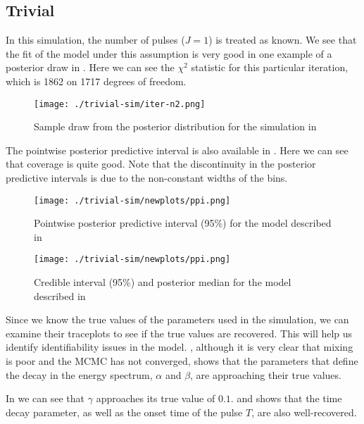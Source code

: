 \documentclass[12pt,letterpaper]{article}
\begin{document}
\subsection{Trivial}
\label{ss:trivial}
In this simulation, the number of pulses ($J=1$) is treated as known. We see that the fit of the model under this assumption is very good in one example of a posterior draw in . Here we can see the $\chi^2$ statistic for this particular iteration, which is 1862 on 1717 degrees of freedom. 

\begin{figure}
 \centering
\texttt{[image: ./trivial-sim/iter-n2.png]}
 
\caption{Sample draw from the posterior distribution for the simulation in }
\label{f:triv-post-sample}
\end{figure}
The pointwise posterior predictive interval is also available in . Here we can see that coverage is quite good. Note that the discontinuity in the posterior predictive intervals is due to the non-constant widths of the bins.


\begin{figure}
 \centering
\texttt{[image: ./trivial-sim/newplots/ppi.png]}
\caption{Pointwise posterior predictive interval (95\%) for the model described in  }
\label{f:triv-ppi}
\end{figure}

\begin{figure}
 \centering
\texttt{[image: ./trivial-sim/newplots/ppi.png]}
\caption{Credible interval (95\%) and posterior median for the model described in  }
\label{f:triv-ci}
\end{figure}

Since we know the true values of the parameters used in the simulation, we can examine their traceplots to see if the true values are recovered. This will help us identify identifiability issues in the model. , although it is very clear that mixing is poor and the MCMC has not converged, shows that the parameters that define the decay in the energy spectrum, $\alpha$ and $\beta$, are approaching their true values. 

In  we can see that $\gamma$ approaches its true value of $0.1$.  and  shows that the time decay parameter, as well as the onset time of the pulse $T$, are also well-recovered.
\end{document}
